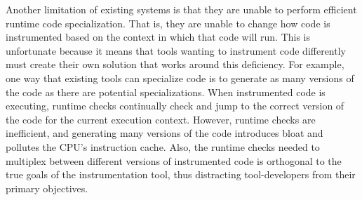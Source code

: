 \documentclass[preprint]{sigplanconf}
\begin{document}


Another limitation of existing systems is that they are unable to perform efficient runtime code specialization. That is, they are unable to change how code is instrumented based on the context in which that code will run. This is unfortunate because it means that tools wanting to instrument code differently must create their own solution that works around this deficiency. For example, one way that existing tools can specialize code is to generate as many versions of the code as there are potential specializations. When instrumented code is executing, runtime checks continually check and jump to the correct version of the code for the current execution context. However, runtime checks are inefficient, and generating many versions of the code introduces bloat and pollutes the CPU's instruction cache. Also, the runtime checks needed to multiplex between different versions of instrumented code is orthogonal to the true goals of the instrumentation tool, thus distracting tool-developers from their primary objectives.

\end{document}
